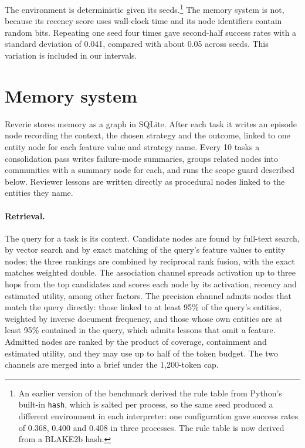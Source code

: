 \documentclass{article}
\begin{document}
The environment is deterministic given its seeds.\footnote{An earlier version of the
benchmark derived the rule table from Python's built-in \texttt{hash}, which is salted
per process, so the same seed produced a different environment in each interpreter: one
configuration gave success rates of 0.368, 0.400 and 0.408 in three processes. The rule
table is now derived from a BLAKE2b hash.} The memory system is not, because its
recency score uses wall-clock time and its node identifiers contain random bits.
Repeating one seed four times gave second-half success rates with a standard deviation
of 0.041, compared with about 0.05 across seeds. This variation is included in our
intervals.

\section{Memory system}
\label{sec:system}

Reverie stores memory as a graph in SQLite. After each task it writes an episode node
recording the context, the chosen strategy and the outcome, linked to one entity node
for each feature value and strategy name. Every 10 tasks a consolidation pass writes
failure-mode summaries, groups related nodes into communities with a summary node for
each, and runs the scope guard described below. Reviewer lessons are written directly
as procedural nodes linked to the entities they name.

\paragraph{Retrieval.}
The query for a task is its context. Candidate nodes are found by full-text search, by
vector search and by exact matching of the query's feature values to entity nodes; the
three rankings are combined by reciprocal rank fusion, with the exact matches weighted
double. The association channel spreads activation up to three hops from the top
candidates and scores each node by its activation, recency and estimated utility, among
other factors. The
precision channel admits nodes that match the query directly: those linked to at least
95\% of the query's entities, weighted by inverse document frequency, and those whose
own entities are at least 95\% contained in the query, which admits lessons that omit a
feature. Admitted nodes are ranked by the product of coverage, containment and
estimated utility, and they may use up to half of the token budget. The two channels
are merged into a brief under the 1,200-token cap.
\end{document}
